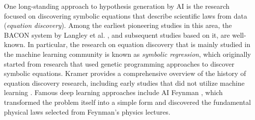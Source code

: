 One long-standing approach to hypothesis generation by AI is the research focused on discovering symbolic equations that describe scientific laws from data (\textit{equation discovery}). Among the earliest pioneering studies in this area, the BACON system by Langley et al. \cite{langley1987scientific}, and subsequent studies based on it, are well-known. In particular, the research on equation discovery that is mainly studied in the machine learning community is known as \textit{symbolic regression}, which originally started from research that used genetic programming approaches to discover symbolic equations.
 Kramer provides a comprehensive overview of the history of equation discovery research, including early studies that did not utilize machine learning \cite{kramer2023automated}. Famous deep learning approaches include AI Feynman \cite{udrescu2020ai,udrescu2020ai2}, which transformed the problem itself into a simple form and discovered the fundamental physical laws selected from Feynman's physics lectures.


